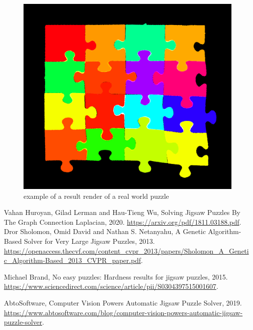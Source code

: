 \documentclass{article}
\begin{document}
\begin{figure}[h]
  \caption{example of a result render of a real world puzzle}\label{fig:result_real}
  \centering
  \includegraphics[height=0.6\textwidth]{pictures/result_real.png}
\end{figure}

\clearpage
\begin{thebibliography}{9}

    Vahan Huroyan, Gilad   Lerman and Hau-Tieng Wu,
    Solving Jigsaw Puzzles By The Graph Connection Laplacian,
    2020.
    \url{https://arxiv.org/pdf/1811.03188.pdf}.
    Dror Sholomon, Omid David and Nathan S. Netanyahu,
    A Genetic Algorithm-Based Solver for Very Large Jigsaw Puzzles,
    2013.
    \url{https://openaccess.thecvf.com/content_cvpr_2013/papers/Sholomon_A_Genetic_Algorithm-Based_2013_CVPR_paper.pdf}.
  
    Michael Brand,
    No easy puzzles: Hardness results for jigsaw puzzles,
    2015.
    \url{https://www.sciencedirect.com/science/article/pii/S0304397515001607}.

    AbtoSoftware,
    Computer Vision Powers Automatic Jigsaw Puzzle Solver,
    2019.
    \url{https://www.abtosoftware.com/blog/computer-vision-powers-automatic-jigsaw-puzzle-solver}.
  
\end{thebibliography}
\end{document}
